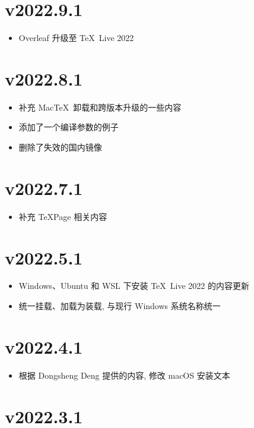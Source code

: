 \section*{v2022.9.1}

\begin{itemize}
  \item Overleaf 升级至 \TeX~Live 2022
\end{itemize}

\section*{v2022.8.1}

\begin{itemize}
  \item 补充 Mac\TeX\ 卸载和跨版本升级的一些内容
  \item 添加了一个编译参数的例子
  \item 删除了失效的国内镜像
\end{itemize}

\section*{v2022.7.1}

\begin{itemize}
  \item 补充 TeXPage 相关内容
\end{itemize}

\section*{v2022.5.1}

\begin{itemize}
  \item Windows、Ubuntu 和 WSL 下安装 \TeX~Live 2022 的内容更新
  \item 统一挂载、加载为装载, 与现行 Windows 系统名称统一
\end{itemize}

\section*{v2022.4.1}

\begin{itemize}
  \item 根据 Dongsheng Deng 提供的内容, 修改 macOS 安装文本
\end{itemize}

\section*{v2022.3.1}

